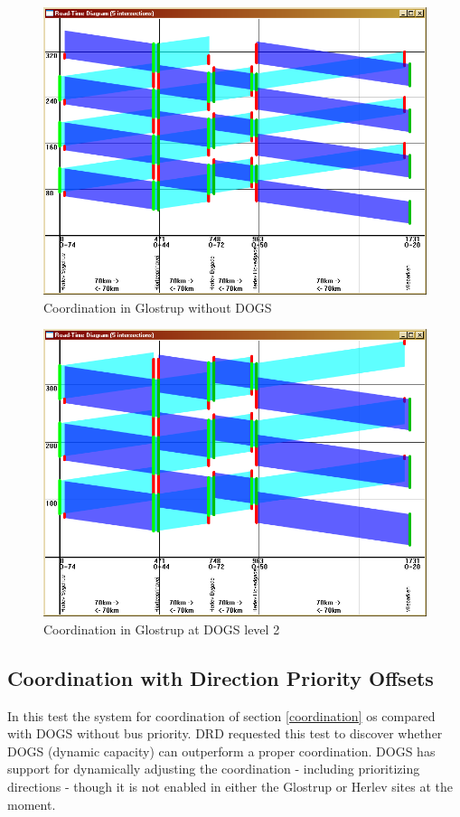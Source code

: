 \begin{figure}[ht]
\begin{center}
\includegraphics[scale=0.30]{coord_p1_herlev_c80.PNG} 
\end{center}
\caption{Coordination in Glostrup without DOGS}
\label{fig:coord_p1_glostrup_c80}
\end{figure}

\begin{figure}[ht]
\begin{center}
\includegraphics[scale=0.30]{coord_p1_herlev_c100.PNG} 
\end{center}
\caption{Coordination in Glostrup at DOGS level 2}
\label{fig:coord_p1_glostrup_c100}
\end{figure}

\subsection{Coordination with Direction Priority Offsets}
In this test the system for coordination of section \ref{coordination} os compared with DOGS without bus priority. DRD requested this test to discover whether DOGS (dynamic capacity) can outperform a proper coordination. DOGS has support for dynamically adjusting the coordination - including prioritizing directions - though it is not enabled in either the Glostrup or Herlev sites at the moment.


